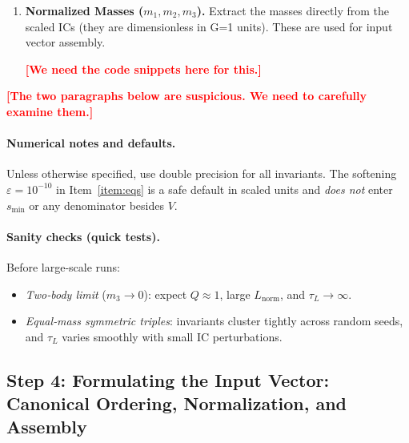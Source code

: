 \documentclass{article}
\newcommand{\authcomment}[1]{\textcolor{Red}{\textbf{[#1]}}}
\begin{document}
\begin{enumerate}
\begin{lstlisting}
        if not divergence:
            return np.inf # Not enough points to calculate divergence

        # Linear regression to find the Lyapunov exponent
        time_steps = np.arange(len(divergence)) * dt
        coeffs = np.polyfit(time_steps, divergence, 1)
        lambda_max = coeffs[0]

        if lambda_max <= 0:
            return np.inf

        return 1.0 / lambda_max

    \end{lstlisting}





    \item \textbf{Normalized Masses ($m_1, m_2, m_3$).}
    Extract the masses directly from the scaled ICs (they are dimensionless in G=1 units). These are used for input vector assembly.

    \authcomment{We need the code snippets here for this.}
\end{enumerate}







\authcomment{The two paragraphs below are suspicious. We need to carefully examine them.}
\paragraph{Numerical notes and defaults.}
Unless otherwise specified, use double precision for all invariants. The softening
$\varepsilon=10^{-10}$ in Item~\ref{item:eqs} is a safe default in scaled units and
\emph{does not} enter $s_{\min}$ or any denominator besides $V$.

\paragraph{Sanity checks (quick tests).}
Before large‑scale runs:
\begin{itemize}
  \item \emph{Two‑body limit} ($m_3\!\to 0$): expect $Q\!\approx\!1$, large $L_{\mathrm{norm}}$,
        and $\tau_L\!\to\!\infty$.
  \item \emph{Equal‑mass symmetric triples}: invariants cluster tightly across random seeds,
        and $\tau_L$ varies smoothly with small IC perturbations.
\end{itemize}

\subsection{Step 4: Formulating the Input Vector: Canonical Ordering, Normalization, and Assembly}
\end{document}
